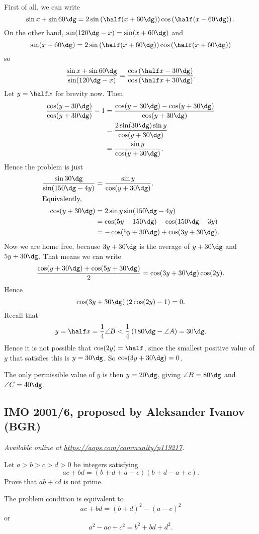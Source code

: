 \documentclass[11pt]{scrartcl}
\begin{document}
First of all, we can write
\[ \sin x + \sin 60\dg
  = 2\sin \left( \half (x+60\dg) \right)
  \cos \left( \half (x-60\dg) \right). \]
On the other hand, $\sin (120\dg - x) = \sin(x+60\dg)$ and
\[ \sin (x+60\dg)
  = 2 \sin \left( \half (x+60\dg) \right)
  \cos \left( \half(x+60\dg) \right) \]
so
\[ \frac{\sin x + \sin 60\dg}{\sin (120\dg - x)}
  = \frac{\cos \left( \half x - 30\dg \right)}%
  {\cos \left( \half x + 30\dg \right)}. \]
Let $y = \half x$ for brevity now. Then
\begin{align*}
  \frac{\cos(y-30\dg)}{\cos(y+30\dg)} - 1
  &= \frac{\cos(y-30\dg)-\cos(y+30\dg)}{\cos(y+30\dg)} \\
  &= \frac{2 \sin (30\dg) \sin y}{\cos(y+30\dg)} \\
  &= \frac{\sin y}{\cos (y+30\dg)}.
\end{align*}
Hence the problem is just
\begin{align*}
  \frac{\sin 30\dg}{\sin(150\dg - 4y)} &= \frac{\sin y}{\cos(y+30\dg)}. \\
  \intertext{Equivalently,}
  \cos(y+30\dg) &= 2\sin y \sin (150\dg -4y) \\
  &= \cos(5y-150\dg) - \cos(150\dg-3y) \\
  &= -\cos(5y+30\dg) + \cos(3y+30\dg).
\end{align*}
Now we are home free, because $3y+30\dg$
is the average of $y+30\dg$ and $5y+30\dg$.
That means we can write
\[ \frac{\cos(y+30\dg)+\cos(5y+30\dg)}{2} = \cos(3y+30\dg) \cos(2y). \]
Hence
\[ \cos(3y+30\dg) \left( 2\cos(2y)-1 \right) = 0. \]
Recall that
\[ y = \half x = \frac 14 \angle B
  < \frac 14 \left( 180\dg - \angle A \right) = 30\dg. \]
Hence it is not possible that $\cos(2y) = \half$,
since the smallest positive value of $y$
that satisfies this is $y=30\dg$.
So $\cos (3y+30\dg) = 0$.

The only permissible value of $y$ is then $y = 20\dg$,
giving $\angle B = 80\dg$ and $\angle C = 40\dg$.
\pagebreak

\subsection{IMO 2001/6, proposed by Aleksander Ivanov (BGR)}
\textsl{Available online at \url{https://aops.com/community/p119217}.}
\begin{mdframed}[style=mdpurplebox,frametitle={Problem statement}]
Let $a > b > c > d > 0$ be integers satisfying
\[ ac + bd = (b+d+a-c)(b+d-a+c).  \]
Prove that $ab + cd$ is not prime.
\end{mdframed}
The problem condition is equivalent to
\[ ac + bd = (b+d)^2 - (a-c)^2 \]
or
\[ a^2-ac+c^2 = b^2+bd+d^2. \]
\end{document}
